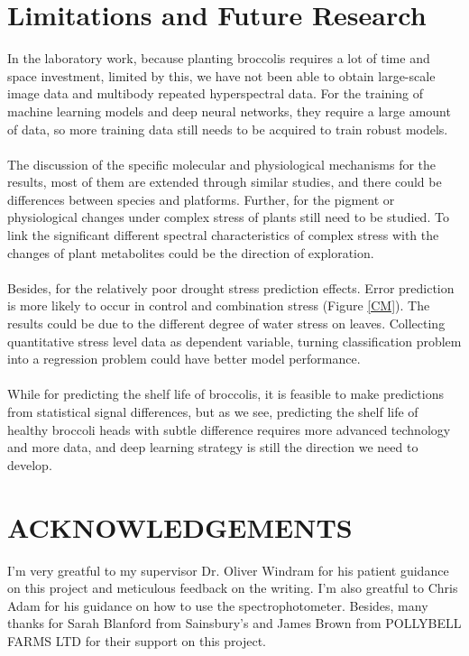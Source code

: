 \documentclass[12pt,a4paper]{article}
\begin{document}
\section{Limitations and Future Research}
In the laboratory work, because planting broccolis requires a lot of time and space investment, limited by this, we have not been able to obtain large-scale image data and multibody repeated hyperspectral data. For the training of machine learning models and deep neural networks, they require a large amount of data, so more training data still needs to be acquired to train robust models.
\\
\\
The discussion of the specific molecular and physiological mechanisms for the results, most of them are extended through similar studies, and there could be differences between species and platforms. Further, for the pigment or physiological changes under complex stress of plants still need to be studied. To link the significant different spectral characteristics of complex stress with the changes of plant metabolites could be the direction of exploration.
\\
\\
Besides, for the relatively poor drought stress prediction effects. Error prediction is more likely to occur in control and combination stress (Figure \ref{CM}). The results could be due to the different degree of water stress on leaves. Collecting quantitative stress level data as dependent variable, turning classification problem into a regression problem could have better model performance.
\\
\\
While for predicting the shelf life of broccolis, it is feasible to make predictions from statistical signal differences, but as we see, predicting the shelf life of healthy broccoli heads with subtle difference requires more advanced technology and more data, and deep learning strategy is still the direction we need to develop.

\section{ACKNOWLEDGEMENTS}
\noindent
I'm very greatful to my supervisor Dr. Oliver Windram for his patient guidance on this project and meticulous feedback on the writing. I'm also greatful to Chris Adam for his guidance on how to use the spectrophotometer. Besides, many thanks for Sarah Blanford from Sainsbury's and James Brown from POLLYBELL FARMS LTD for their support on this project.
\end{document}
